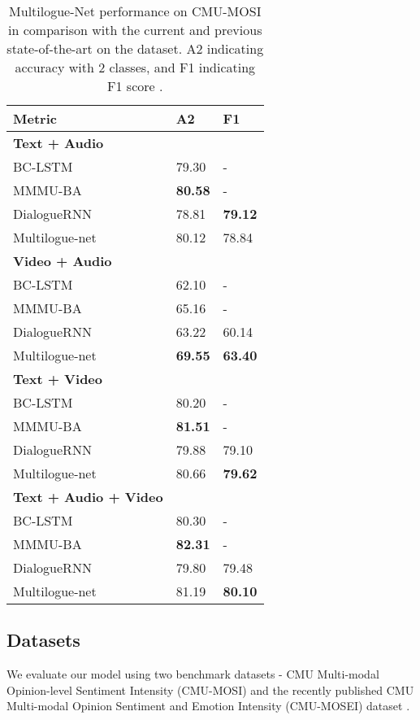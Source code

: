 \documentclass[11pt,a4paper]{article}
\begin{document}
\begin{table}
\centering
\begin{tabular}{lll}
\hline
\textbf{Metric} & \textbf{A2} & \textbf{F1}\\
\hline
\textbf{Text + Audio} \\
\hline
BC-LSTM & 79.30 & - \\
MMMU-BA & \textbf{80.58} & - \\
DialogueRNN & 78.81 & \textbf{79.12} \\
Multilogue-net & 80.12 & 78.84 \\
\hline

\textbf{Video + Audio} \\
\hline
BC-LSTM & 62.10 & - \\
MMMU-BA & 65.16 & - \\
DialogueRNN & 63.22 & 60.14 \\
Multilogue-net & \textbf{69.55} & \textbf{63.40} \\
\hline

\textbf{Text + Video} \\
\hline
BC-LSTM & 80.20 & - \\
MMMU-BA & \textbf{81.51} & - \\
DialogueRNN & 79.88 & 79.10 \\
Multilogue-net & 80.66 & \textbf{79.62} \\
\hline

\textbf{Text + Audio + Video} \\
\hline
BC-LSTM & 80.30 & - \\
MMMU-BA & \textbf{82.31} & - \\
DialogueRNN & 79.80 & 79.48 \\
Multilogue-net & 81.19 & \textbf{80.10} \\
\hline

\end{tabular}
\caption{\label{tab:mosi}
Multilogue-Net performance on CMU-MOSI in comparison with the current and previous state-of-the-art on the dataset. A2 indicating accuracy with 2 classes, and F1 indicating F1 score .
}
\end{table}


\subsection{Datasets}
We evaluate our model using two benchmark datasets - CMU Multi-modal Opinion-level Sentiment Intensity (CMU-MOSI) \cite{mosi}  and the recently published CMU Multi-modal Opinion Sentiment and Emotion Intensity (CMU-MOSEI) dataset \cite{mosei}.
\end{document}
